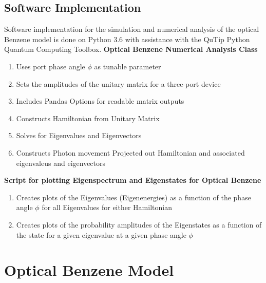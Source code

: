 \section{Software Implementation}
Software implementation for the simulation and numerical analysis of the optical Benzene model is done on Python 3.6 with assistance with the QuTip Python Quantum Computing Toolbox. \newline
\textbf{Optical Benzene Numerical Analysis Class}
\begin{enumerate}
    \item Uses port phase angle $\phi$ as tunable parameter
    \item Sets the amplitudes of the unitary matrix for a three-port device
    \item Includes Pandas Options for readable matrix outputs
    \item Constructs Hamiltonian from Unitary Matrix
    \item Solves for Eigenvalues and Eigenvectors
    \item Constructs Photon movement Projected out Hamiltonian and associated eigenvaleus and eigenvectors
\end{enumerate}
\textbf{Script for plotting Eigenspectrum and Eigenstates for Optical Benzene} 
\begin{enumerate}
    \item Creates plots of the Eigenvalues (Eigenenergies) as a function of the phase angle $\phi$ for all Eigenvalues for either Hamiltonian
    \item Creates plots of the probability amplitudes of the Eigenstates as a function of the state for a given eigenvalue at a given phase angle $\phi$
\end{enumerate}

 
 
 
 
 
 
 
 
 
 
 
 
 \chapter{Optical Benzene Model}
